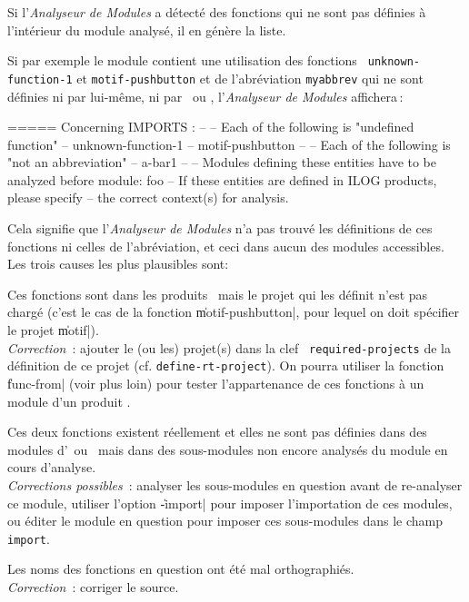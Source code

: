 
Si l'{\em Analyseur de Modules} a d\'{e}tect\'{e} des fonctions qui ne sont pas d\'{e}finies
\`{a} l'int\'{e}rieur du module analys\'{e}, il en g\'{e}n\`{e}re la liste.

Si par exemple le module contient une utilisation des fonctions {\tt
unknown-function-1} et {\tt motif-pushbutton} et de l'abr\'{e}viation
{\tt myabbrev} qui ne sont d\'{e}finies ni par
lui-m\^{e}me, ni par \Aida\ ou \LeLisp, l'{\em Analyseur de Modules} affichera\,:

\begin{Longcode*}
===== Concerning IMPORTS :
--
-- Each of the following is "undefined function"
--      unknown-function-1 
--      motif-pushbutton
--
-- Each of the following is "not an abbreviation"
--      a-bar1
--
-- Modules defining these entities have to be analyzed before module: foo
-- If these entities are defined in ILOG products, please specify
-- the correct context(s) for analysis.

\end{Longcode*}

Cela signifie que l'{\em Analyseur de Modules} n'a pas trouv\'{e} les
d\'{e}finitions de ces fonctions ni celles de l'abr\'{e}viation, et ceci dans
aucun des modules accessibles.
Les trois causes les 
plus plausibles sont:

\begin {Itemize}

\item Ces fonctions sont dans les produits \Ilog \ mais le projet
qui les d\'{e}finit n'est pas charg\'{e} (c'est le cas de la
fonction \|motif-pushbutton|, pour lequel on doit sp\'{e}cifier le
projet \|motif|). \\
{\it Correction}\ : ajouter le (ou les) projet(s) dans la clef {\tt
required-projects} de 
la d\'{e}finition de ce projet (cf. {\tt define-rt-project}).
On pourra utiliser la fonction \|func-from| (voir plus loin) pour
tester l'appartenance de ces fonctions \`{a} un module d'un produit
\Ilog.

\item Ces deux fonctions existent r\'{e}ellement et elles ne sont pas
d\'{e}finies dans des modules d'\Aida\ ou \LeLisp\ mais dans des
sous-modules non encore analys\'{e}s du module en cours d'analyse. \\
{\it Corrections possibles}\ : analyser les sous-modules en question avant
de re-analyser ce module, utiliser l'option \|-import| 
pour imposer l'importation de ces modules, ou \'{e}diter le
module en question pour imposer ces sous-modules dans le champ {\tt import}.

\item Les noms des fonctions en question ont \'{e}t\'{e} mal orthographi\'{e}s.\\
{\it Correction}\ : corriger le source.

\end {Itemize}

